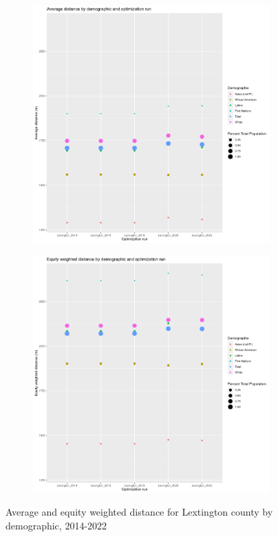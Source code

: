 \documentclass[11pt]{article}
\theoremstyle{remark}
\theoremstyle{definition}
\begin{document}
\begin{figure}
	\begin{subfigure}{.8\textwidth}
		\centering
		\includegraphics[width=.8\linewidth]{result_analysis/Lexington_SC_original_configs/orig_pop_scaled_avg}
		\label{sfig:Lexington avg dist}
	\end{subfigure} \newline
	\begin{subfigure}{.8\textwidth}
		\centering
		\includegraphics[width=.8\linewidth]{result_analysis/Lexington_SC_original_configs/orig_pop_scaled_y_EDE}
		\label{sfig:Lexington equity dist}
	\end{subfigure}
	\caption{Average and equity weighted distance for Lextington county by demographic, 2014-2022}
	\label{fig:Lexington distance graphs}
\end{figure}
\end{document}
